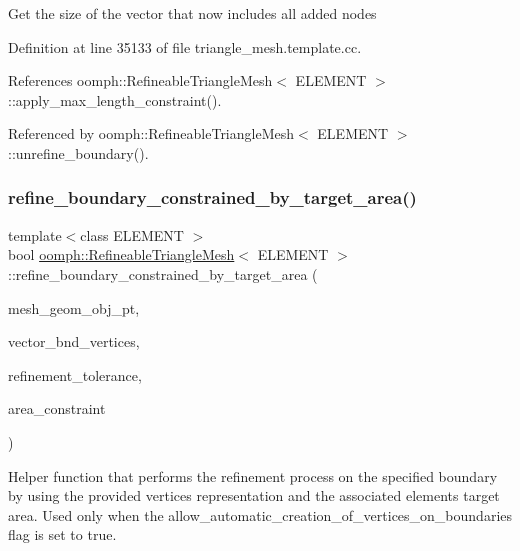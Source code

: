 Get the size of the vector that now includes all added nodes 

Definition at line 35133 of file triangle\+\_\+mesh.\+template.\+cc.



References oomph\+::\+Refineable\+Triangle\+Mesh$<$ E\+L\+E\+M\+E\+N\+T $>$\+::apply\+\_\+max\+\_\+length\+\_\+constraint().



Referenced by oomph\+::\+Refineable\+Triangle\+Mesh$<$ E\+L\+E\+M\+E\+N\+T $>$\+::unrefine\+\_\+boundary().

\mbox{\label{classoomph_1_1RefineableTriangleMesh_abd9edf3c6c57a337301abe8828ca0567}} 
\subsubsection{\texorpdfstring{refine\+\_\+boundary\+\_\+constrained\+\_\+by\+\_\+target\+\_\+area()}{refine\_boundary\_constrained\_by\_target\_area()}}
{\footnotesize\ttfamily template$<$class E\+L\+E\+M\+E\+NT $>$ \\
bool \hyperlink{classoomph_1_1RefineableTriangleMesh}{oomph\+::\+Refineable\+Triangle\+Mesh}$<$ E\+L\+E\+M\+E\+NT $>$\+::refine\+\_\+boundary\+\_\+constrained\+\_\+by\+\_\+target\+\_\+area (\begin{DoxyParamCaption}\item[{Mesh\+As\+Geom\+Object $\ast$}]{mesh\+\_\+geom\+\_\+obj\+\_\+pt,  }\item[{Vector$<$ Vector$<$ double $>$ $>$ \&}]{vector\+\_\+bnd\+\_\+vertices,  }\item[{double \&}]{refinement\+\_\+tolerance,  }\item[{Vector$<$ double $>$ \&}]{area\+\_\+constraint }\end{DoxyParamCaption})\hspace{0.3cm}{\ttfamily [protected]}}



Helper function that performs the refinement process on the specified boundary by using the provided vertices representation and the associated elements target area. Used only when the \textquotesingle{}allow\+\_\+automatic\+\_\+creation\+\_\+of\+\_\+vertices\+\_\+on\+\_\+boundaries\textquotesingle{} flag is set to true. 

